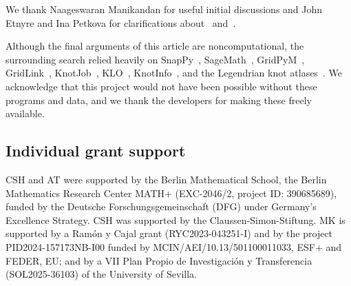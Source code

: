 \documentclass{amsart} %
\theoremstyle{thm}
\theoremstyle{definition}
\numberwithin{equation}{section}
\begin{document}
We thank Naageswaran Manikandan for useful initial discussions and John Etnyre and Ina Petkova for clarifications about~\cite{Etnyre_neighborhood} and~\cite{PetkovaSchwartz}.

Although the final arguments of this article are noncomputational, the surrounding search relied heavily on SnapPy~\cite{SnapPy}, SageMath~\cite{Sage}, GridPyM~\cite{BC24}, GridLink~\cite{GridLink}, KnotJob~\cite{KnotJob}, KLO~\cite{KLO}, KnotInfo~\cite{KnotInfo}, and the Legendrian knot atlases~\cite{CN_Leg_knot_atlas,PetkovaSchwartz,LSULegendrianAtlas}. We acknowledge that this project would not have been possible without these programs and data, and we thank the developers for making these freely available.

\subsection*{Individual grant support}

CSH and AT were supported by the Berlin Mathematical School, the Berlin Mathematics Research Center MATH+ (EXC-2046/2, project ID: 390685689), funded by the Deutsche Forschungsgemeinschaft (DFG) under Germany’s Excellence Strategy.
CSH was supported by the Claussen-Simon-Stiftung.
MK is supported by a Ram\'on y Cajal grant (RYC2023-043251-I) and by the project PID2024-157173NB-I00 funded by MCIN/AEI/10.13/501100011033, ESF+ and FEDER, EU; and by a VII Plan Propio de Investigación y Transferencia (SOL2025-36103) of the University of Sevilla.





\end{document}
